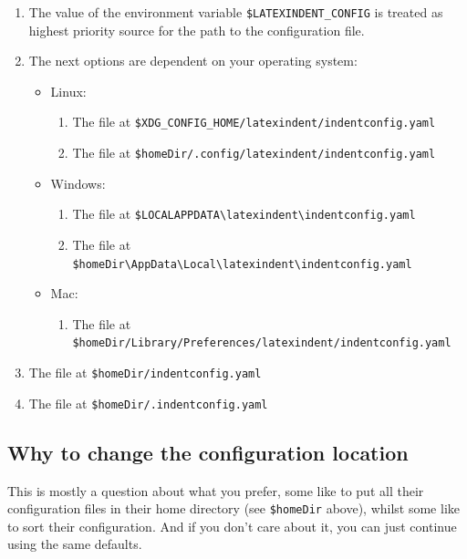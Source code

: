   \begin{enumerate}
   \item The value of the environment variable \texttt{\$LATEXINDENT\_CONFIG} is treated
         as highest priority source for the path to the configuration file.
   \item The next options are dependent on your operating system:
         \begin{itemize}
          \item Linux:
                \begin{enumerate}
                 \item The file at
                       \texttt{\$XDG\_CONFIG\_HOME/latexindent/indentconfig.yaml}
                 \item The file at
                       \texttt{\$homeDir/.config/latexindent/indentconfig.yaml}
                \end{enumerate}
          \item Windows:
                \begin{enumerate}
                 \item The file at
                       \texttt{\$LOCALAPPDATA\textbackslash{}latexindent\textbackslash{}indentconfig.yaml}
                 \item The file at
                       \texttt{\$homeDir\textbackslash{}AppData\textbackslash{}Local\textbackslash{}latexindent\textbackslash{}indentconfig.yaml}
                \end{enumerate}
          \item Mac:
                \begin{enumerate}
                 \item The file at
                       \texttt{\$homeDir/Library/Preferences/latexindent/indentconfig.yaml}
                \end{enumerate}
         \end{itemize}
   \item The file at \texttt{\$homeDir/indentconfig.yaml}
   \item The file at \texttt{\$homeDir/.indentconfig.yaml}
  \end{enumerate}
 \subsection{Why to change the configuration location}
  This is mostly a question about what you prefer, some like to put all their configuration files in their home directory (see \texttt{\$homeDir} above),
  whilst some like to sort their configuration. And if you don't care about it, you can just continue using the same defaults.
